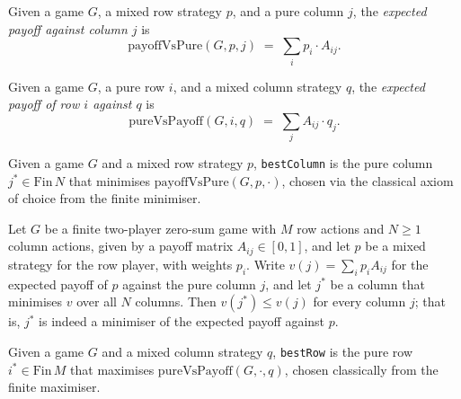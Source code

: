 \begin{definition}
\label{payoffVsPure}
\leanok
{}
Given a game $G$, a mixed row strategy $p$, and a pure column $j$, the
\emph{expected payoff against column $j$} is
\[
  \mathrm{payoffVsPure}(G, p, j) \;=\; \sum_{i} p_i \cdot A_{ij}.
\]
\end{definition}

\begin{definition}
\label{pureVsPayoff}
\leanok
{}
Given a game $G$, a pure row $i$, and a mixed column strategy $q$, the
\emph{expected payoff of row $i$ against $q$} is
\[
  \mathrm{pureVsPayoff}(G, i, q) \;=\; \sum_{j} A_{ij} \cdot q_j.
\]
\end{definition}

\begin{definition}
\label{bestColumn}
\leanok
{}
Given a game $G$ and a mixed row strategy $p$, \texttt{bestColumn} is the pure
column $j^* \in \mathrm{Fin}\,N$ that minimises $\mathrm{payoffVsPure}(G, p,
\cdot)$, chosen via the classical axiom of choice from the finite minimiser.
\end{definition}

\begin{lemma}
\label{bestColumn_spec}
\leanok
{}
Let $G$ be a finite two-player zero-sum game with $M$ row actions and $N \ge 1$ column
actions, given by a payoff matrix $A_{ij} \in [0,1]$, and let $p$ be a mixed strategy
for the row player, with weights $p_i$. Write $v(j) = \sum_i p_i A_{ij}$ for the
expected payoff of $p$ against the pure column $j$, and let $j^*$ be a column that
minimises $v$ over all $N$ columns. Then $v(j^*) \le v(j)$ for every column $j$; that
is, $j^*$ is indeed a minimiser of the expected payoff against $p$.
\end{lemma}

\begin{definition}
\label{bestRow}
\leanok
{}
Given a game $G$ and a mixed column strategy $q$, \texttt{bestRow} is the pure
row $i^* \in \mathrm{Fin}\,M$ that maximises $\mathrm{pureVsPayoff}(G, \cdot,
q)$, chosen classically from the finite maximiser.
\end{definition}

